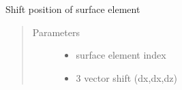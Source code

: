 \documentclass[letterpaper,10pt,english]{sphinxmanual}
\begin{document}

\begin{fulllineitems}
\label{\detokenize{xsrt_functions:xsrt.shift}}
Shift position of surface element
\begin{quote}\begin{description}
\item[{Parameters}] \leavevmode\begin{itemize}
\item {} 
 \textendash{} surface element index

\item {} 
 \textendash{} 3 vector shift (dx,dx,dz)

\end{itemize}

\end{description}\end{quote}

\end{fulllineitems}

\end{document}

